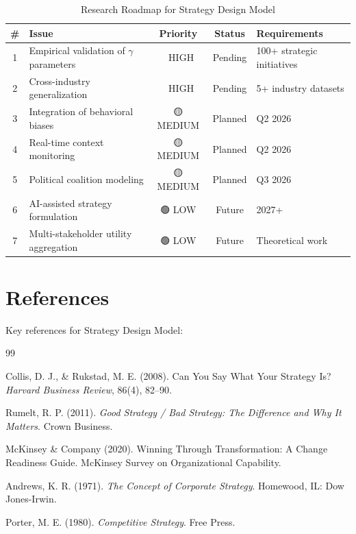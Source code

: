 \begin{table}[htbp]
\centering
\caption{Research Roadmap for Strategy Design Model}
\label{tab:sdm-roadmap}
\renewcommand{\arraystretch}{1.3}
\begin{tabular}{@{}clccl@{}}
\toprule
\textbf{\#} & \textbf{Issue} & \textbf{Priority} & \textbf{Status} & \textbf{Requirements} \\
\midrule
1 & Empirical validation of $\gamma$ parameters & 🔴 HIGH & Pending & 100+ strategic initiatives \\
2 & Cross-industry generalization & 🔴 HIGH & Pending & 5+ industry datasets \\
3 & Integration of behavioral biases & 🟡 MEDIUM & Planned & Q2 2026 \\
4 & Real-time context monitoring & 🟡 MEDIUM & Planned & Q2 2026 \\
5 & Political coalition modeling & 🟡 MEDIUM & Planned & Q3 2026 \\
6 & AI-assisted strategy formulation & 🟢 LOW & Future & 2027+ \\
7 & Multi-stakeholder utility aggregation & 🟢 LOW & Future & Theoretical work \\
\bottomrule
\end{tabular}
\end{table}

\section{References}
\label{sec:sdm-references}

Key references for Strategy Design Model:

\nocite{bcm_master}

\begin{thebibliography}{99}

 Collis, D. J., \& Rukstad, M. E. (2008). Can You Say What Your Strategy Is? \textit{Harvard Business Review}, 86(4), 82--90.

 Rumelt, R. P. (2011). \textit{Good Strategy / Bad Strategy: The Difference and Why It Matters}. Crown Business.

 McKinsey \& Company (2020). Winning Through Transformation: A Change Readiness Guide. McKinsey Survey on Organizational Capability.

 Andrews, K. R. (1971). \textit{The Concept of Corporate Strategy}. Homewood, IL: Dow Jones-Irwin.

 Porter, M. E. (1980). \textit{Competitive Strategy}. Free Press.

\end{thebibliography}

